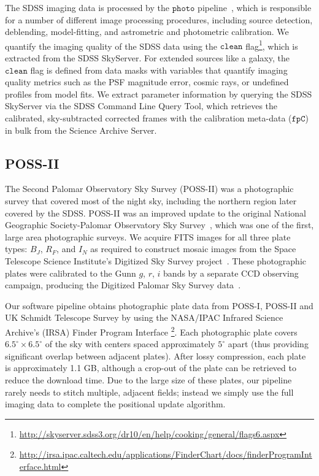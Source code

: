 \documentclass[authoryear, 12pt, 5p, times]{elsarticle}
\begin{document}
The SDSS imaging data is processed by the $\texttt{photo}$ pipeline~\citep{sdss-photo}, which is responsible for a number of different image processing procedures, including source detection, deblending, model-fitting, and astrometric and photometric calibration. We quantify the imaging quality of the SDSS data using the $\texttt{clean}$ flag\footnote{\url{http://skyserver.sdss3.org/dr10/en/help/cooking/general/flags6.aspx}}, which is extracted from the SDSS SkyServer. For extended sources like a galaxy, the $\texttt{clean}$ flag is defined from data masks with variables that quantify imaging quality metrics such as the PSF magnitude error, cosmic rays, or undefined profiles from model fits. We extract parameter information by querying the SDSS SkyServer via the SDSS Command Line Query Tool, which retrieves the calibrated, sky-subtracted corrected frames with the calibration meta-data ($\texttt{fpC}$) in bulk from the Science Archive Server.

\subsection{POSS-II\label{POSSII}}
The Second Palomar Observatory Sky Survey (POSS-II) was a photographic survey that covered most of the night sky, including the northern region later covered by the SDSS. POSS-II was an improved update to the original National Geographic Society-Palomar Observatory Sky Survey~\citep[NGS-POSS or POSS-I;][]{ngs-poss}, which was one of the first, large area photographic surveys. We acquire FITS images for all three plate types: $B_J$, $R_F$, and $I_N$ as required to construct mosaic images from the Space Telescope Science Institute's Digitized Sky Survey project~\citep[DSS;][]{dss}.  These photographic plates were calibrated to the  Gunn $g$, $r$, $i$ bands by a separate CCD observing campaign, producing the Digitized Palomar Sky Survey data~\citep[DPOSS;][]{dposs}. 

Our software pipeline obtains photographic plate data from POSS-I, POSS-II and UK Schmidt Telescope Survey by using the NASA/IPAC Infrared Science Archive's (IRSA) Finder Program Interface \footnote{\url{http://irsa.ipac.caltech.edu/applications/FinderChart/docs/finderProgramInterface.html}}. Each photographic plate covers $6.5^{\circ} \times 6.5^{\circ}$ of the sky with centers spaced approximately $5^{\circ}$ apart (thus providing significant overlap between adjacent plates). After lossy compression, each plate is approximately 1.1 GB, although a crop-out of the plate can be retrieved to reduce the download time. Due to the large size of these plates, our pipeline rarely needs to stitch multiple, adjacent fields; instead we simply use the full imaging data to complete the positional update algorithm.
\end{document}
